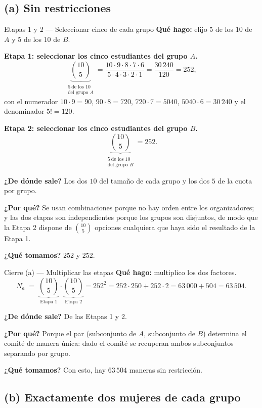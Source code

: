 \documentclass[11pt]{article}
\begin{document}
\subsection*{(a) Sin restricciones}

\begin{paso}{Etapas 1 y 2 --- Seleccionar cinco de cada grupo}
\textbf{Qu\'e hago:} elijo $5$ de los $10$ de $A$ y $5$ de los $10$ de $B$.

\medskip
\textbf{Etapa 1: seleccionar los cinco estudiantes del grupo $A$.}
\[
\underbrace{\binom{10}{5}}_{\substack{5\ \text{de los 10}\\ \text{del grupo }A}}
=\frac{10\cdot 9\cdot 8\cdot 7\cdot 6}{5\cdot 4\cdot 3\cdot 2\cdot 1}=\frac{30\,240}{120}=252 ,
\]
con el numerador $10\cdot 9=90$, $90\cdot 8=720$, $720\cdot 7=5040$, $5040\cdot 6=30\,240$ y el denominador
$5!=120$.

\medskip
\textbf{Etapa 2: seleccionar los cinco estudiantes del grupo $B$.}
\[
\underbrace{\binom{10}{5}}_{\substack{5\ \text{de los 10}\\ \text{del grupo }B}}=252 .
\]

\textbf{¿De d\'onde sale?} Los dos $10$ del tama\~no de cada grupo y los dos $5$ de la cuota por grupo.

\textbf{¿Por qu\'e?} Se usan combinaciones porque no hay orden entre los organizadores; y las dos etapas son
independientes porque los grupos son disjuntos, de modo que la Etapa 2 dispone de $\binom{10}{5}$ opciones
cualquiera que haya sido el resultado de la Etapa 1.

\textbf{¿Qu\'e tomamos?} $252$ y $252$.
\end{paso}

\begin{paso}{Cierre (a) --- Multiplicar las etapas}
\textbf{Qu\'e hago:} multiplico los dos factores.
\[
N_a\;=\;\underbrace{\binom{10}{5}}_{\text{Etapa 1}}\cdot\underbrace{\binom{10}{5}}_{\text{Etapa 2}}
=252^2=252\cdot 250+252\cdot 2=63\,000+504=63\,504 .
\]

\textbf{¿De d\'onde sale?} De las Etapas 1 y 2.

\textbf{¿Por qu\'e?} Porque el par (subconjunto de $A$, subconjunto de $B$) determina el comit\'e de manera
\'unica: dado el comit\'e se recuperan ambos subconjuntos separando por grupo.

\textbf{¿Qu\'e tomamos?} Con esto, hay $63\,504$ maneras sin restricci\'on.
\end{paso}

\subsection*{(b) Exactamente dos mujeres de cada grupo}
\end{document}
